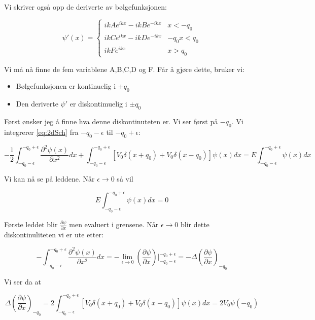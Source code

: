 \documentclass[a4paper,norsk, 10pt]{article}
\numberwithin{equation}{section}
\begin{document}
Vi skriver også opp de deriverte av bølgefunksjonen:

\begin{equation}
\psi'(x) = 
\begin{cases}
ikAe^{ikx} - ikBe^{-ikx} & x< -q_0 \\
ikCe^{ikx} -ikDe^{-ikx} & -q_0x< q_0 \\
ikFe^{ikx} & x>q_0 
\end{cases}
\label{eq:psiDer}
\end{equation}

Vi må nå finne de fem variablene A,B,C,D og F. Får å gjøre dette, bruker vi:

\begin{itemize}
\item Bølgefunksjonen er kontinuelig i $\pm q_0$
\item Den deriverte $\psi'$ er diskontimuelig i $\pm q_0$
\end{itemize}

Først ønsker jeg å finne hva denne diskontinuteten er. Vi ser først på $-q_0$. Vi integrerer \ref{eq:2dSch} fra $-q_0 - \epsilon$ til $-q_0 + \epsilon$:

$$
-\frac{1}{2}\int_{-q_0 - \epsilon}^{-q_0 + \epsilon}\frac{\partial^2 \psi(x)}{\partial x^2}dx + \int_{-q_0 - \epsilon}^{-q_0 + \epsilon}\left[V_0\delta(x+q_0) + V_0\delta(x-q_0)\right]\psi(x)dx = E\int_{-q_0 - \epsilon}^{-q_0 + \epsilon}\psi(x) dx
$$

Vi kan nå se på leddene. Når $\epsilon \rightarrow 0$ så vil 

$$E\int_{-q_0 - \epsilon}^{-q_0 + \epsilon}\psi(x) dx = 0$$

Første leddet blir $\frac{\partial \psi}{\partial x}$ men evaluert i grensene. Når $\epsilon \rightarrow 0$ blir dette diskontinuliteten vi er ute etter:

$$
-\int_{-q_0 - \epsilon}^{-q_0 + \epsilon}\frac{\partial^2 \psi(x)}{\partial x^2}dx = -\lim_{\epsilon \rightarrow 0}\left(\frac{\partial \psi}{\partial x}\right)\bigg|_{-q_0 - \epsilon}^{-q_0 + \epsilon} = -\Delta \left(\frac{\partial \psi}{\partial x}\right)_{-q_0}
$$

Vi ser da at

\begin{equation}
\Delta \left(\frac{\partial \psi}{\partial x}\right)_{-q_0} = 2\int_{-q_0 - \epsilon}^{-q_0 + \epsilon}\left[V_0\delta(x+q_0) + V_0\delta(x-q_0)\right]\psi(x)dx = 2V_0\psi(-q_0)
\label{eq:deltapsi-q0}
\end{equation}
\end{document}

